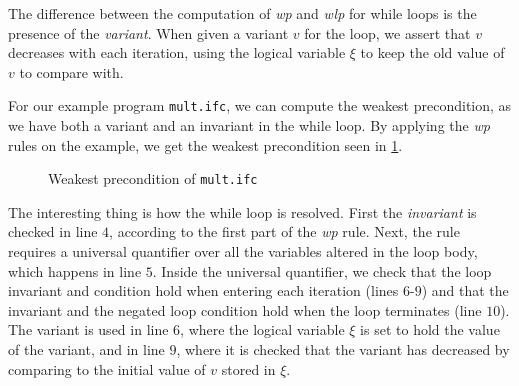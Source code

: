 The difference between the computation of \textit{wp} and \textit{wlp} for while loops is the presence of the \textit{variant}.
When given a variant $v$ for the loop, we assert that $v$ decreases with each iteration, using the logical variable $\xi$ to keep the old value of $v$ to compare with.

For our example program \texttt{mult.ifc}, we can compute the weakest precondition, as we have both a variant and an invariant in the while loop.
By applying the \textit{wp} rules on the example, we get the weakest precondition seen in \cref{figure:wpmult}.

\begin{figure}[h!]

\caption{Weakest precondition of \texttt{mult.ifc}}
\label{figure:wpmult}
\end{figure}

The interesting thing is how the while loop is resolved. First the \textit{invariant} is checked in line $4$, according to the first part of the \textit{wp} rule.
Next, the rule requires a universal quantifier over all the variables altered in the loop body, which happens in line $5$.
Inside the universal quantifier, we check that the loop invariant and condition hold when entering each iteration (lines $6$-$9$) and that the invariant and the negated loop condition hold when the loop terminates (line $10$).
The variant is used in line $6$, where the logical variable $\xi$ is set to hold the value of the variant, and in line $9$, where it is checked that the variant has decreased by comparing to the initial value of $v$ stored in $\xi$.
